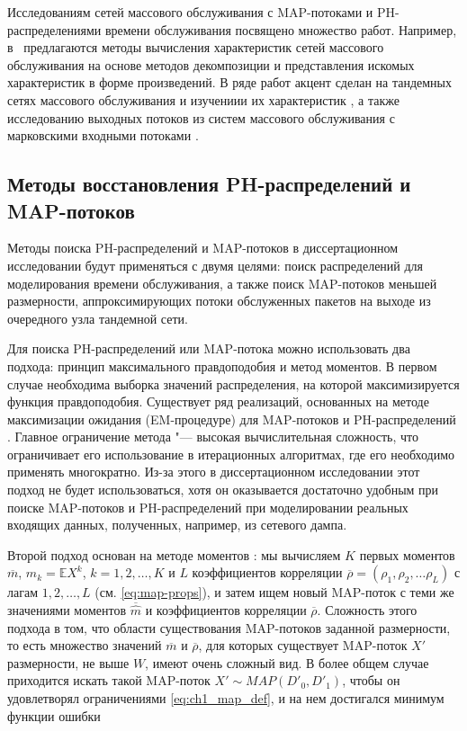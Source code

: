 Исследованиям сетей массового обслуживания с MAP-потоками и PH-распределениями времени обслуживания посвящено множество работ. Например, в~\cite{Strelen1998, Henderson1990, Strelen1997, Strelen1997a} предлагаются методы вычисления характеристик сетей массового обслуживания на основе методов декомпозиции и представления искомых характеристик в форме произведений. В ряде работ акцент сделан на тандемных сетях массового обслуживания и изучениии их характеристик \cite{Kim2018, Kim2012, Kim2007, Buchholz2006}, а также исследованию выходных потоков из систем массового обслуживания с марковскими входными потоками \cite{Bean1998, Lian2011}.

\subsection{Методы восстановления PH-распределений и MAP-потоков}\label{sec:ch1_qs_ph_fitting}

Методы поиска PH-распределений и MAP-потоков в диссертационном исследовании будут применяться с двумя целями: поиск распределений для моделирования времени обслуживания, а также поиск MAP-потоков меньшей размерности, аппроксимирующих потоки обслуженных пакетов на выходе из очередного узла тандемной сети.

Для поиска PH-распределений или MAP-потока можно использовать два подхода: принцип максимального правдоподобия и метод моментов. В первом случае необходима выборка значений распределения, на которой максимизируется функция правдоподобия. Существует ряд реализаций, основанных на методе максимизации ожидания (EM-процедуре) для MAP-потоков \cite{Horvath2013,Ephraim2009,Buchholz2003,Okamura2009} и PH-распределений \cite{Asmussen1996,Bobbio1992,Thummler2005,Okamura2013,Okamura2011,ElAbdouniKhayari2003}. Главное ограничение метода "--- высокая вычислительная сложность, что ограничивает его использование в итерационных алгоритмах, где его необходимо применять многократно. Из-за этого в диссертационном исследовании этот подход не будет использоваться, хотя он оказывается достаточно удобным при поиске MAP-потоков и PH-распределений при моделировании реальных входящих данных, полученных, например, из сетевого дампа.

Второй подход основан на методе моментов \cite{TelekHorvath2007,Bodrog2010,Bodrog2008,Horvath2005,Schmickler1992}: мы вычисляем $K$ первых моментов $\overline{m}$, $m_k = \mathbb{E}X^k$, $k = 1, 2, \dots, K$  и $L$ коэффициентов корреляции $\overline{\rho} = (\rho_1, \rho_2, \dots \rho_L)$ с лагам $1, 2, \dots, L$ (см. \eqref{eq:map-props}), и затем ищем новый MAP-поток с теми же значениями моментов $\overline{\hat{m}}$ и коэффициентов корреляции $\overline{\rho}$. Сложность этого подхода в том, что области существования MAP-потоков заданной размерности, то есть множество значений $\overline{m}$ и $\overline{\rho}$, для которых существует MAP-поток $X'$ размерности, не выше $W$, имеют очень сложный вид. В более общем случае приходится искать такой MAP-поток $X' \sim MAP(D'_0, D'_1)$, чтобы он удовлетворял ограничениями \eqref{eq:ch1_map_def}, и на нем достигался минимум функции ошибки

